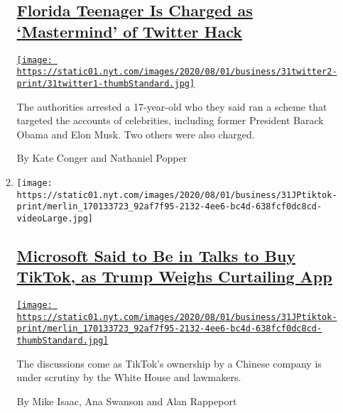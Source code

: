 \begin{enumerate}
\begin{enumerate}
    \hypertarget{florida-teenager-is-charged-as-mastermind-of-twitter-hack}{%
    \subsection{\texorpdfstring{\href{/2020/07/31/technology/twitter-hack-arrest.html}{Florida
    Teenager Is Charged as `Mastermind' of Twitter
    Hack}}{Florida Teenager Is Charged as `Mastermind' of Twitter Hack}}\label{florida-teenager-is-charged-as-mastermind-of-twitter-hack}}

    \href{/2020/07/31/technology/twitter-hack-arrest.html}{\texttt{[image: https://static01.nyt.com/images/2020/08/01/business/31twitter2-print/31twitter1-thumbStandard.jpg]}}

    The authorities arrested a 17-year-old who they said ran a scheme
    that targeted the accounts of celebrities, including former
    President Barack Obama and Elon Musk. Two others were also charged.

    By Kate Conger and Nathaniel Popper
  \item
    \texttt{[image: https://static01.nyt.com/images/2020/08/01/business/31JPtiktok-print/merlin\_170133723\_92af7f95-2132-4ee6-bc4d-638fcf0dc8cd-videoLarge.jpg]}

    \hypertarget{microsoft-said-to-be-in-talks-to-buy-tiktok-as-trump-weighs-curtailing-app}{%
    \subsection{\texorpdfstring{\href{/2020/07/31/technology/tiktok-microsoft.html}{Microsoft
    Said to Be in Talks to Buy TikTok, as Trump Weighs Curtailing
    App}}{Microsoft Said to Be in Talks to Buy TikTok, as Trump Weighs Curtailing App}}\label{microsoft-said-to-be-in-talks-to-buy-tiktok-as-trump-weighs-curtailing-app}}

    \href{/2020/07/31/technology/tiktok-microsoft.html}{\texttt{[image: https://static01.nyt.com/images/2020/08/01/business/31JPtiktok-print/merlin\_170133723\_92af7f95-2132-4ee6-bc4d-638fcf0dc8cd-thumbStandard.jpg]}}

    The discussions come as TikTok's ownership by a Chinese company is
    under scrutiny by the White House and lawmakers.

    By Mike Isaac, Ana Swanson and Alan Rappeport
  \end{enumerate}
\end{enumerate}

